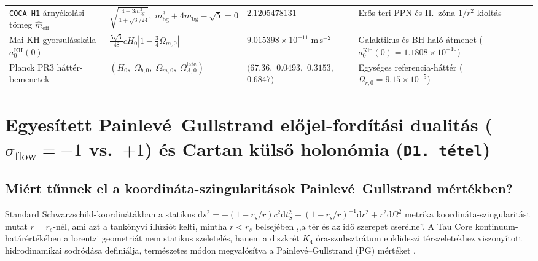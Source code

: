 \documentclass[11pt,a4paper]{article}
\theoremstyle{remark}
\begin{document}
\begin{table}[htbp]
{\begin{tabular}{L{4.1cm}L{4.5cm}L{3.9cm}L{4.2cm}}
\texttt{COCA-H1} \'arny\'ekol\'asi t\"omeg $\hat{m}_{\mathrm{eff}}$ & $\sqrt{\frac{4+3m_{\mathrm{bg}}^2}{1+\sqrt{3}/24}},\; m_{\mathrm{bg}}^3+4m_{\mathrm{bg}}-\sqrt{5}=0$ & $2.1205478131$ & Er\H{o}s-teri PPN \'es II.\ z\'ona $1/r^2$ kiolt\'as \\
Mai KH-gyorsul\'assk\'ala $a_0^{\mathrm{KH}}(0)$ & $\frac{5\sqrt{3}}{48}cH_0\left|1 - \frac{3}{4}\Omega_{m,0}\right|$ & $9.015398 \times 10^{-11}\;\mathrm{m\,s^{-2}}$ & Galaktikus \'es BH-hal\'o \'atmenet ($a_0^{\mathrm{Kin}}(0)=1.1808\times 10^{-10}$) \\
Planck PR3 h\'att\'er-bemenetek & $(H_0,\; \Omega_{b,0},\; \Omega_{m,0},\; \Omega_{\Lambda,0}^{\mathrm{late}})$ & $(67.36,$ $0.0493,$ $0.3153,$ $0.6847)$ & Egys\'eges referencia-h\'att\'er ($\Omega_{r,0}=9.15\times 10^{-5}$) \\
\bottomrule
\end{tabular}%
}
\end{table}

\section{Egyes\'itett Painlev\'e--Gullstrand el\H{o}jel-ford\'it\'asi dualit\'as (\texorpdfstring{$\sigma_{\mathrm{flow}} = -1$ vs.\ $+1$}{sigma\_flow = -1 vs. +1}) \'es Cartan k\"uls\H{o} holon\'omia (\texttt{D1.\ t\'etel})}
\label{sec:duality}

\subsection{Mi\'ert t\H{u}nnek el a koordin\'ata-szingularit\'asok Painlev\'e--Gullstrand m\'ert\'ekben?}

Standard Schwarzschild-koordin\'at\'akban a statikus $\mathrm{d}s^2 = -(1 - r_s/r)c^2\mathrm{d}t_S^2 + (1 - r_s/r)^{-1}\mathrm{d}r^2 + r^2\mathrm{d}\Omega^2$ metrika koordin\'ata-szingularit\'ast mutat $r = r_s$-n\'el, ami azt a tank\"onyvi ill\'uzi\'ot kelti, mintha $r < r_s$ belsej\'eben ,,a t\'er \'es az id\H{o} szerepet cser\'elne''. A Tau Core kontinuum-hat\'ar\'ert\'ek\'eben \cite{JolcsakTauFoundationSeries2026} a lorentzi geometri\'at nem statikus szeletel\'es, hanem a diszkr\'et $K_4$ \'ora-szubsztr\'atum euklideszi t\'erszeletekhez viszony\'itott hidrodinamikai sodr\'od\'asa defini\'alja, term\'eszetes m\'odon megval\'os\'itva a Painlev\'e--Gullstrand (PG) m\'ert\'eket \cite{Painleve1921,Gullstrand1922}.
\end{document}
